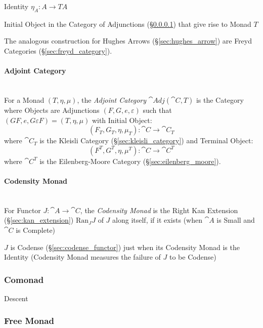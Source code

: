 Identity $\eta_A : A \rightarrow T A$

Initial Object in the Category of Adjunctions
(\S\ref{sec:adjoint_category}) that give rise to Monad $T$

The analogous construction for Hughes Arrows
(\S\ref{sec:hughes_arrow}) are Freyd Categories
(\S\ref{sec:freyd_category}).



\paragraph{Adjoint Category}\label{sec:adjoint_category}
\hfill \\

For a Monad $(T,\eta,\mu)$, the \emph{Adjoint Category}
$\cat{Adj}(\cat{C}, T)$ is the Category where Objects are
Adjunctions $(F,G,e,\varepsilon)$ such that $(GF,e,G \varepsilon F) =
(T,\eta,\mu)$ with Initial Object:
\[
  (F_T, G_T, \eta, \mu_T) : \cat{C} \rightarrow \cat{C}_T
\]
where $\cat{C}_T$ is the Kleisli Category
(\S\ref{sec:kleisli_category}) and Terminal Object:
\[
  (F^T, G^T, \eta, \mu^T) : \cat{C} \rightarrow \cat{C}^T
\]
where $\cat{C}^T$ is the Eilenberg-Moore Category
(\S\ref{sec:eilenberg_moore}).



\paragraph{Codensity Monad}\label{sec:codensity_monad}
\hfill \\

For Functor $J : \cat{A} \rightarrow \cat{C}$, the \emph{Codensity
  Monad} is the Right Kan Extension (\S\ref{sec:kan_extension})
$\mathrm{Ran}_J J$ of $J$ along itself, if it exists (when $\cat{A}$
is Small and $\cat{C}$ is Complete)

$J$ is Codense (\S\ref{sec:codense_functor}) just when its Codensity
Monad is the Identity (Codensity Monad measures the failure of $J$ to
be Codense)



\subsubsection{Comonad}\label{sec:comonad}

Descent



\subsubsection{Free Monad}\label{sec:free_monad}

